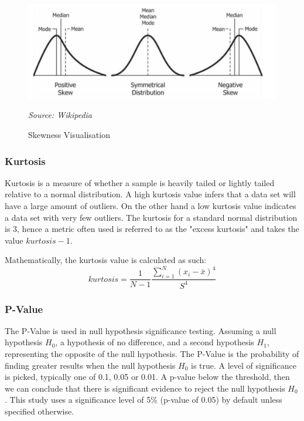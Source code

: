 \begin{figure}[h!]
      \centering
      \includegraphics[scale=0.8]{lit_review/skewness.png}
      \caption{Skewness Visualisation}
      \label{skewness fig}
      \emph{Source: Wikipedia}
\end{figure}

\subsubsection{Kurtosis}

Kurtosis is a measure of whether a sample is heavily tailed or lightly tailed relative to a normal distribution. A high kurtosis value infers that a data set will have a large amount of outliers. On the other hand a low kurtosis value indicates a data set with very few outliers. The kurtosis for a standard normal distribution is 3, hence a metric often used is referred to as the "excess kurtosis" and takes the value $kurtosis - 1$.

Mathematically, the kurtosis value is calculated as such:
\begin{equation}
    kurtosis = \frac{1}{N - 1} \frac{\sum_{i=1}^{N}(x_{i} - \bar{x})^{4}}{S^{4}}
\end{equation}

\subsubsection{P-Value}

The P-Value is used in null hypothesis significance testing. Assuming a null hypothesis $H_{0}$, a hypothesis of no difference, and a second hypothesis $H_{1}$, representing the opposite of the null hypothesis. The P-Value is the probability of finding greater results when the null hypothesis $H_{0}$ is true. A level of significance is picked, typically one of 0.1, 0.05 or 0.01. A p-value below the threshold, then we can conclude that there is significant evidence to reject the null hypothesis $H_{0}$. This study uses a significance level of 5\% (p-value of 0.05) by default unless specified otherwise.


